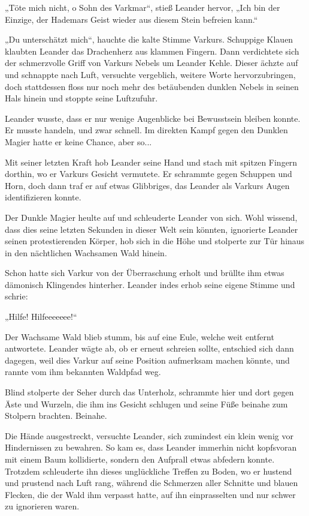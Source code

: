 \documentclass[10pt, a4paper, oneside]{book}
\begin{document}
„Töte mich nicht, o Sohn des Varkmar“, stieß Leander hervor, „Ich bin der Einzige, der Hademars Geist wieder aus diesem Stein befreien kann.“

„Du unterschätzt mich“, hauchte die kalte Stimme Varkurs. Schuppige Klauen klaubten Leander das Drachenherz aus klammen Fingern. Dann verdichtete sich der schmerzvolle Griff von Varkurs Nebels um Leander Kehle. Dieser ächzte auf und schnappte nach Luft, versuchte vergeblich, weitere Worte hervorzubringen, doch stattdessen floss nur noch mehr des betäubenden dunklen Nebels in seinen Hals hinein und stoppte seine Luftzufuhr.

Leander wusste, dass er nur wenige Augenblicke bei Bewusstsein bleiben konnte. Er musste handeln, und zwar schnell. Im direkten Kampf gegen den Dunklen Magier hatte er keine Chance, aber so...

Mit seiner letzten Kraft hob Leander seine Hand und stach mit spitzen Fingern dorthin, wo er Varkurs Gesicht vermutete. Er schrammte gegen Schuppen und Horn, doch dann traf er auf etwas Glibbriges, das Leander als Varkurs Augen identifizieren konnte.

Der Dunkle Magier heulte auf und schleuderte Leander von sich. Wohl wissend, dass dies seine letzten Sekunden in dieser Welt sein könnten, ignorierte Leander seinen protestierenden Körper, hob sich in die Höhe und stolperte zur Tür hinaus in den nächtlichen Wachsamen Wald hinein.

Schon hatte sich Varkur von der Überraschung erholt und brüllte ihm etwas dämonisch Klingendes hinterher. Leander indes erhob seine eigene Stimme und schrie:

„Hilfe! Hilfeeeeeee!“

Der Wachsame Wald blieb stumm, bis auf eine Eule, welche weit entfernt antwortete. Leander wägte ab, ob er erneut schreien sollte, entschied sich dann dagegen, weil dies Varkur auf seine Position aufmerksam machen könnte, und rannte vom ihm bekannten Waldpfad weg.

Blind stolperte der Seher durch das Unterholz, schrammte hier und dort gegen Äste und Wurzeln, die ihm ins Gesicht schlugen und seine Füße beinahe zum Stolpern brachten. Beinahe.

Die Hände ausgestreckt, versuchte Leander, sich zumindest ein klein wenig vor Hindernissen zu bewahren. So kam es, dass Leander immerhin nicht kopfsvoran mit einem Baum kollidierte, sondern den Aufprall etwas abfedern konnte. Trotzdem schleuderte ihn dieses unglückliche Treffen zu Boden, wo er hustend und prustend nach Luft rang, während die Schmerzen aller Schnitte und blauen Flecken, die der Wald ihm verpasst hatte, auf ihn einprasselten und nur schwer zu ignorieren waren.
\end{document}
